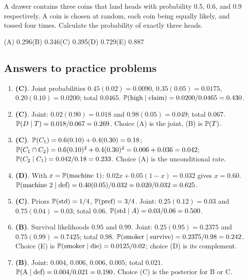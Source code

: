 \begin{practice}
A drawer contains three coins that land heads with probability 0.5, 0.6, and 0.9
respectively. A coin is chosen at random, each coin being equally likely, and tossed four
times. Calculate the probability of exactly three heads.
\par\smallskip\noindent (A) 0.296\qquad (B) 0.346\qquad (C) 0.395\qquad (D) 0.729\qquad (E) 0.887
\end{practice}

\subsection{Answers to practice problems}

\begin{enumerate}[nosep,leftmargin=2em]
  \item \textbf{(C)}. Joint probabilities $0.45(0.02) = 0.0090$, $0.35(0.05) = 0.0175$,
        $0.20(0.10) = 0.0200$; total $0.0465$. $\mathbb{P}(\text{high} \mid \text{claim}) = 0.0200/0.0465 = 0.430$.
  \item \textbf{(C)}. Joint: $0.02(0.90) = 0.018$ and $0.98(0.05) = 0.049$; total $0.067$.
        $\mathbb{P}(D \mid T) = 0.018/0.067 = 0.269$. Choice (A) is the joint, (B) is $\mathbb{P}(T)$.
  \item \textbf{(C)}. $\mathbb{P}(C_1) = 0.6(0.10) + 0.4(0.30) = 0.18$;
        $\mathbb{P}(C_1 \cap C_2) = 0.6(0.10)^2 + 0.4(0.30)^2 = 0.006 + 0.036 = 0.042$;
        $\mathbb{P}(C_2 \mid C_1) = 0.042/0.18 = 0.233$. Choice (A) is the unconditional rate.
  \item \textbf{(D)}. With $x = \mathbb{P}(\text{machine 1})$: $0.02x + 0.05(1 - x) = 0.032$ gives
        $x = 0.60$. $\mathbb{P}(\text{machine 2} \mid \text{def}) = 0.40(0.05)/0.032 = 0.020/0.032 = 0.625$.
  \item \textbf{(C)}. Priors $\mathbb{P}(\text{std}) = 1/4$, $\mathbb{P}(\text{pref}) = 3/4$. Joint:
        $0.25(0.12) = 0.03$ and $0.75(0.04) = 0.03$; total $0.06$. $\mathbb{P}(\text{std} \mid A) = 0.03/0.06 = 0.500$.
  \item \textbf{(B)}. Survival likelihoods $0.95$ and $0.99$. Joint: $0.25(0.95) = 0.2375$ and
        $0.75(0.99) = 0.7425$; total $0.98$. $\mathbb{P}(\text{smoker} \mid \text{survive}) = 0.2375/0.98 = 0.242$.
        Choice (E) is $\mathbb{P}(\text{smoker} \mid \text{die}) = 0.0125/0.02$; choice (D) is its complement.
  \item \textbf{(B)}. Joint: $0.004$, $0.006$, $0.006$, $0.005$; total $0.021$.
        $\mathbb{P}(\text{A} \mid \text{def}) = 0.004/0.021 = 0.190$. Choice (C) is the posterior for B or C.

\end{enumerate}
